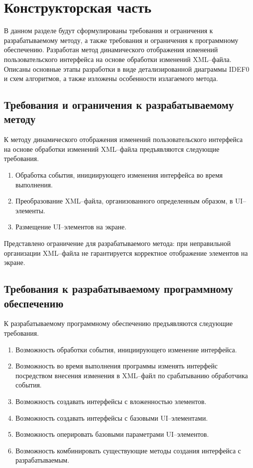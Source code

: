 \section{Конструкторская часть}

В данном разделе будут сформулированы требования и ограничения к разрабатываемому методу, а также требования и ограничения к программному обеспечению. 
Разработан метод динамического отображения изменений пользовательского интерфейса на основе обработки изменений XML--файла.
Описаны основные этапы разработки в виде детализированной диаграммы IDEF0 и схем алгоритмов, а также изложены особенности излагаемого метода. 

\subsection{Требования и ограничения к разрабатываемому методу}

К методу динамического отображения изменений пользовательского интерфейса на основе обработки изменений XML--файла предъявляются следующие требования.
\begin{enumerate}[label*=\arabic*.]
	\item Обработка события, инициирующего изменения интерфейса во время выполнения.
	\item Преобразование XML--файла, организованного определенным образом, в UI--элементы.
	\item Размещение UI--элементов на экране.
\end{enumerate}
	
Представлено ограничение для разрабатываемого метода: при неправильной организации XML--файла не гарантируется корректное отображение элементов на экране.

\subsection{Требования к разрабатываемому программному обеспечению}

К разрабатываемому программному обеспечению предъявляются следующие требования.
\begin{enumerate}[label*=\arabic*.]
	\item Возможность обработки события, инициирующего изменение интерфейса.
	\item Возможность во время выполнения программы изменять интерфейс посредством внесения изменения в XML--файл по срабатыванию обработчика события.
	\item Возможность создавать интерфейсы с вложенностью элементов.
	\item Возможность создавать интерфейсы с базовыми UI--элементами.
	\item Возможность оперировать базовыми параметрами UI--элементов.
	\item Возможность комбинировать существующие методы создания интерфейса с разрабатываемым.
\end{enumerate}

